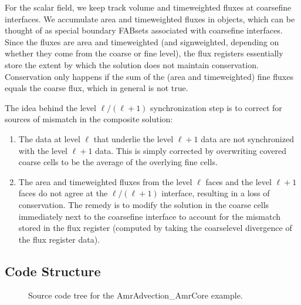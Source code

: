 \documentclass[letterpaper,10pt,english]{sphinxmanual}
\begin{document}
\sphinxAtStartPar
For the scalar field, we keep track volume and time\sphinxhyphen{}weighted fluxes at coarse\sphinxhyphen{}fine interfaces.
We accumulate area and time\sphinxhyphen{}weighted fluxes in  objects, which can be
thought of as special boundary FABsets associated with coarse\sphinxhyphen{}fine interfaces.
Since the fluxes are area and time\sphinxhyphen{}weighted (and sign\sphinxhyphen{}weighted, depending on whether they
come from the coarse or fine level), the flux registers essentially store the extent by
which the solution does not maintain conservation. Conservation only happens if the
sum of the (area and time\sphinxhyphen{}weighted) fine fluxes equals the coarse flux, which in general
is not true.

\sphinxAtStartPar
The idea behind the level \(\ell/(\ell+1)\) synchronization step is to correct for sources of
mismatch in the composite solution:
\begin{enumerate}
%
\item {} 
\sphinxAtStartPar
The data at level \(\ell\) that underlie the level \(\ell+1\) data are not synchronized with the level \(\ell+1\) data.
This is simply corrected by overwriting covered coarse cells to be the average of the overlying fine cells.

\item {} 
\sphinxAtStartPar
The area and time\sphinxhyphen{}weighted fluxes from the level \(\ell\) faces and the level \(\ell+1\) faces
do not agree at the \(\ell/(\ell+1)\) interface, resulting in a loss of conservation.
The remedy is to modify the solution in the coarse cells immediately next to the coarse\sphinxhyphen{}fine interface
to account for the mismatch stored in the flux register (computed by taking the coarse\sphinxhyphen{}level divergence of the
flux register data).

\end{enumerate}


\subsection{Code Structure}
\label{\detokenize{AmrCore:code-structure}}
\begin{figure}[htbp]
\centering
\capstart

\noindent{}
\caption{Source code tree for the AmrAdvection\_AmrCore example.}\label{\detokenize{AmrCore:id4}}\label{\detokenize{AmrCore:fig-amradvection-amrcore-flowchart}}\end{figure}
\end{document}
